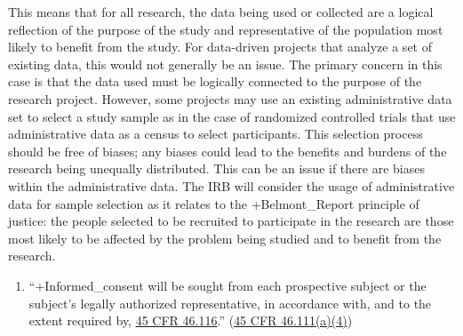 \documentclass[
]{WileySix}
\providecommand{\tightlist}{%
  \setlength{\itemsep}{0pt}\setlength{\parskip}{0pt}}
\begin{document}
This means that for all research, the data being used or collected are a logical reflection of the purpose of the study and representative of the population most likely to benefit from the study. For data-driven projects that analyze a set of existing data, this would not generally be an issue. The primary concern in this case is that the data used must be logically connected to the purpose of the research project. However, some projects may use an existing administrative data set to select a study sample as in the case of randomized controlled trials that use administrative data as a census to select participants. This selection process should be free of biases; any biases could lead to the benefits and burdens of the research being unequally distributed. This can be an issue if there are biases within the administrative data. The IRB will consider the usage of administrative data for sample selection as it relates to the +Belmont\_Report\textbar{} principle of justice: the people selected to be recruited to participate in the research are those most likely to be affected by the problem being studied and to benefit from the research.

\begin{enumerate}
\def\labelenumi{(\arabic{enumi})}
\setcounter{enumi}{3}
\tightlist
\item
  ``+Informed\_consent\textbar{} will be sought from each prospective subject or the subject's legally authorized representative, in accordance with, and to the extent required by, \href{https://www.law.cornell.edu/cfr/text/45/46.116}{45 CFR 46.116}.'' (\href{https://www.law.cornell.edu/cfr/text/45/46.111}{45 CFR 46.111(a)(4)})
\end{enumerate}
\end{document}
